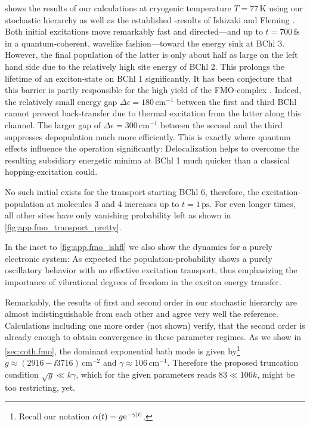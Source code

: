  shows the results of our calculations at cryogenic temperature $T=77\,\mathrm{K}$ using our stochastic hierarchy as well as the established \HEOM-results of Ishizaki and Fleming \cite{IsFl09_fmo}.
Both initial excitations move remarkably fast and directed---and up to $t=700\,\mathrm{fs}$ in a quantum-coherent, wavelike fashion---toward the energy sink at BChl 3.
However, the final population of the latter is only about half as large on the left hand side due to the relatively high site energy of BChl 2.
This prolongs the lifetime of an exciton-state on BChl 1 significantly.
It has been conjecture that this barrier is partly responsible for the high yield of the FMO-complex \cite{IsFl09_fmo}.
Indeed, the relatively small energy gap $\Delta\epsilon = 180\, \mathrm{cm^{-1}}$ between the first and third BChl cannot prevent back-transfer due to thermal excitation from the latter along this channel.
The larger gap of $\Delta\epsilon = 300\,\mathrm{cm^{-1}}$ between the second and the third suppresses depopulation much more efficiently.
This is exactly where quantum effects influence the operation significantly:
Delocalization helps to overcome the resulting subsidiary energetic minima at BChl 1 much quicker than a classical hopping-excitation could.

No such initial  exists for the transport starting BChl 6, therefore, the excitation-population at molecules 3 and 4 increases up to $t = 1\,\mathrm{ps}$.
For even longer times, all other sites have only vanishing probability left as shown in \autoref{fig:app.fmo_transport_pretty}.

In the inset to \autoref{fig:app.fmo_ishfl} we also show the dynamics for a purely electronic system:
As expected the population-probability shows a purely oscillatory behavior with no effective excitation transport, thus emphasizing the importance of vibrational degrees of freedom in the exciton energy transfer.

Remarkably, the results of first and second order in our stochastic hierarchy are almost indistinguishable from each other and agree very well the reference.
Calculations including one more order (not shown) verify, that the second order is already enough to obtain convergence in these parameter regimes.
As we show in \autoref{sec:coth.fmo}, the dominant exponential bath mode is given by\footnote{%
  Recall our notation $\alpha(t) = g \exp[-\gamma\abs{t}]$.
}
$g \approx (2916 - \ii 3716) \, \mathrm{cm^{-2}}$ and $\gamma \approx 106\,\mathrm{cm^{-1}}$.
Therefore the proposed truncation condition $\sqrt{g} \ll k \gamma$, which for the given parameters reads $83 \ll 106 k$, might be too restricting, yet.

